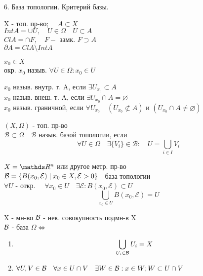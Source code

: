 \documentclass[11pt, fleqn]{article}
\begin{document}
    \begin{question}{6. База топологии. Критерий базы.}
        \begin{definition} 
            X - топ. пр-во; $\quad A \subset X$ \\
            $Int A = \cup U, \quad U \in \Omega \quad U \subset A$\\
            $Cl A = \cap F, \quad F - $ замк. $F \supset A$ \\
            $\partial A = Cl A \setminus Int A$
        \end{definition}

        \begin{definition} 
            $x_0 \in X$\\
            окр. $x_0$ назыв. $\forall U \in \Omega: x_0 \in U$
        \end{definition}

        \begin{definition} 
            $x_0$ назыв. внутр. т. A, если $\exists U_{x_0} \subset A$\\
            $x_0$ назыв. внеш. т. A, если $\exists U_{x_0} \cap A = \varnothing$\\
            $x_0$ назыв. граничной, если $\forall U_{x_0} \quad (U_{x_0} \not \subset A)$ и $(U_{x_0} \cap A \neq \varnothing)$
        \end{definition}

        \begin{definition} 
            $(X, \Omega)$ - топ. пр-во\\
            $\mathcal{B} \subset \Omega \quad \mathcal{B}$ назыв. базой топологии, если\\
            \[\forall U \in \Omega \quad \exists \{V_i\} \in \mathcal{B}: \quad U = \bigcup_{i \in I} V_i\] 
        \end{definition}

        \begin{example} 
            $X = \R^n$ или другое метр. пр-во\\
            $\mathcal{B} = \{B(x_0, \mathcal{E}) \; | \; x_0 \in X, \mathcal{E} > 0\}$ - база топологии\\
            $\forall U$ - откр. $\quad \forall x_0 \in U \quad \exists \mathcal{E}: B(x_0, \mathcal{E}) \subset U$\\
            \[\bigcup_{x_0 \in U} B(x_0, \mathcal{E}) = U\]
        \end{example}

        \begin{theorem} 
            X - мн-во $\mathcal{B}$ - нек. совокупность подмн-в X\\
            $\mathcal{B}$ - база $\Omega \Leftrightarrow$ \begin{enumerate}
                \item \[\bigcup_{U_i \in \mathcal{B}} U_i = X\]
                \item $\forall U, V \in \mathcal{B} \quad \forall x \in U \cap V \quad \exists W \in \mathcal{B} : x \in W; W \subset U\cap V$
            \end{enumerate}
        \end{theorem}


\end{question}
\end{document}
